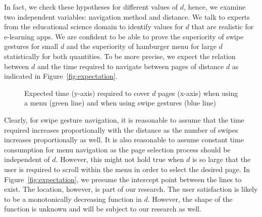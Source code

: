 \documentclass{sig-alternate-05-2015}
\begin{document}
In fact, we check these hypotheses for different values of $d$, hence, we examine two independent variables: navigation method and distance. We talk to experts from the educational science domain to identify values for $d$ that are realistic for e-learning apps.
We are confident to be able to prove the superiority of swipe gestures for small $d$ and the superiority of hamburger menu for large $d$ statistically for both quantities.
To be more precise, we expect the relation between $d$ and the time required to navigate between pages of distance $d$ as indicated in Figure~\ref{fig:expectation}.
\begin{figure}
\caption{Expected time (y-axis) required to cover $d$ pages (x-axis) when using a menu (green line) and when using swipe gestures (blue line)}
\end{figure}
Clearly, for swipe gesture navigation, it is reasonable to assume that the time required increases proportionally with the distance as the number of swipes increases proportionally as well.
It is also reasonable to assume constant time consumption for menu navigation as the page selection process should be independent of $d$. However, this might not hold true when $d$ is so large that
the user is required to scroll within the menu in order to select the desired page. In Figure~\ref{fig:expectation}, we presume the intercept point between the lines to exist. The location, however,
is part of our research.
The user satisfaction is likely to be a monotonically decreasing function in $d$. However, the shape of the function is unknown and will be subject to our research as well.
\end{document}
